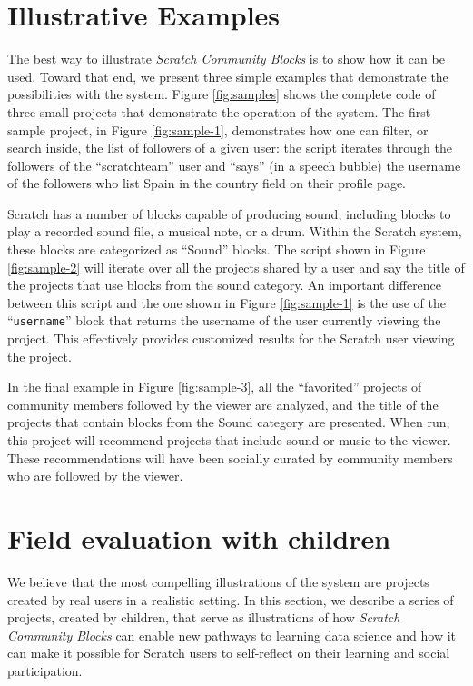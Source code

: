 \documentclass{sigchi}
\begin{document}
\section{Illustrative Examples}

The best way to illustrate \emph{Scratch Community Blocks} is to show how it can be used. Toward that end, we present three simple examples that demonstrate the possibilities with the system. Figure \ref{fig:samples} shows the complete code of three small projects that demonstrate the operation of the system.
The first sample project, in Figure \ref{fig:sample-1}, demonstrates how one can filter, or search inside, the list of followers of a given user: the script iterates through the followers of the ``scratchteam'' user and ``says'' (in a speech bubble) the username of the followers who list Spain in the country field on their profile page.

Scratch has a number of blocks capable of producing sound, including blocks to play a recorded sound file, a musical note, or a drum. Within the Scratch system, these blocks are categorized as ``Sound'' blocks. The script shown in Figure \ref{fig:sample-2} will iterate over all the projects shared by a user and say the title of the projects that use blocks from the sound category. An important difference between this script and the one shown in Figure \ref{fig:sample-1} is the use of the ``\texttt{username}'' block that returns the username of the user currently viewing the project. This effectively provides customized  results for the Scratch user viewing the project.

In the final example in Figure \ref{fig:sample-3}, all the ``favorited'' projects of community members followed by the viewer are analyzed, and the title of the projects that contain blocks from the Sound category are presented. When run, this project will recommend projects that include sound or music to the viewer. These recommendations will have been socially curated by community members who are followed by the viewer.

\section{Field evaluation with children}

We believe that the most compelling illustrations of the system are projects created by real users in a realistic setting. In this section, we describe a series of projects, created by children, that serve as illustrations of how \emph{Scratch Community Blocks} can enable new pathways to learning data science and how it can make it possible for Scratch users to self-reflect on their learning and social participation. 
\end{document}
